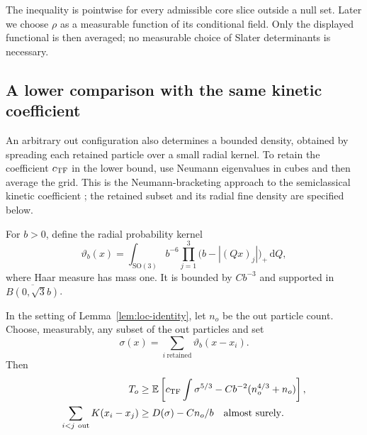 The inequality is pointwise for every admissible core slice outside
a null set.  Later we choose $\rho$ as a measurable function of its
conditional field.  Only the displayed functional is then averaged;
no measurable choice of Slater determinants is necessary.

\subsection{A lower comparison with the same kinetic coefficient}

An arbitrary out configuration also determines a bounded density,
obtained by spreading each retained particle over a small radial
kernel.  To retain the coefficient $c_{\mathrm{TF}}$ in the lower bound, use
Neumann eigenvalues in cubes and then average the grid. This is the
Neumann-bracketing approach to the semiclassical kinetic coefficient
\citep[Theorems~III.10--III.13]{LiebSimon1977}; the retained subset and
its radial fine density are specified below.

For $b>0$, define the radial probability kernel
\begin{equation}\label{eq:loc-fine-kernel}
 \vartheta_b(x)=\int_{\mathrm{SO}(3)}
       b^{-6}\prod_{j=1}^3\big(b-|(Qx)_j|\big)_+\,\mathrm dQ,
\end{equation}
where Haar measure has mass one.  It is bounded by $Cb^{-3}$ and
supported in $\overline{B(0,\sqrt3b)}$.

\begin{lemma}
\label{lem:loc-cubes}
In the setting of Lemma~\ref{lem:loc-identity}, let $n_o$ be the
out particle count.  Choose, measurably, any subset of the out
particles and set
\[
 \sigma(x)=\sum_{i\ \mathrm{retained}}\vartheta_b(x-x_i).
\]
Then
\begin{align}
 T_o&\geq\mathbb E\left[c_{\mathrm{TF}}\int\sigma^{5/3}
               -Cb^{-2}(n_o^{4/3}+n_o)\right],
 \label{eq:loc-fine-kinetic}\\
 \sum_{i<j\ \mathrm{out}}K(x_i-x_j)
   &\geq D(\sigma)-Cn_o/b
 \quad\text{almost surely}.
 \label{eq:loc-fine-pair}
\end{align}
\end{lemma}

